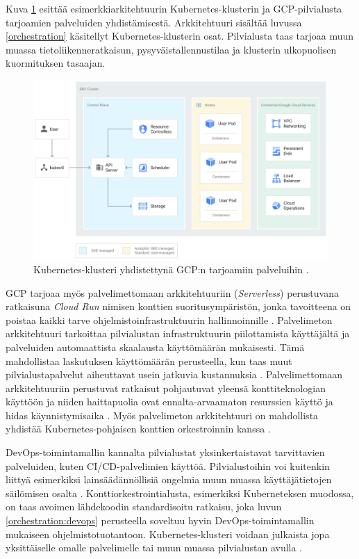 Kuva \ref{fig:architecture} esittää esimerkkiarkitehtuurin Kubernetes-klusterin ja GCP-pilvialusta tarjoamien palveluiden yhdistämisestä.
Arkkitehtuuri sisältää luvussa \ref{orchestration} käsitellyt Kubernetes-klusterin osat.
Pilvialusta taas tarjoaa muun muassa tietoliikenneratkaisun, pysyväistallennustilaa ja klusterin ulkopuolisen kuormituksen tasaajan.


\begin{figure}[ht]
\begin{center}
\includegraphics[width=1\textwidth]{figures/gke_architecture.png}
\caption{Kubernetes-klusteri yhdistettynä GCP:n tarjoamiin palveluihin \cite{cluster23}\label{fig:architecture}.}
\end{center}
\end{figure}

GCP tarjoaa myös palvelimettomaan arkkitehtuuriin (\textit{Serverless}) perustuvana ratkaisuna \textit{Cloud Run} nimisen konttien suoritusympäristön, jonka tavoitteena on poistaa kaikki tarve ohjelmistoinfrastruktuurin hallinnoinnille \cite{Products23}.
Palvelimeton arkkitehtuuri tarkoittaa pilvialustan infrastruktuurin piilottamista käyttäjältä ja palveluiden automaattista skaalausta käyttömäärän mukaisesti.
Tämä mahdollistaa laskutuksen käyttömäärän perusteella, kun taas muut pilvialustapalvelut aiheuttavat usein jatkuvia kustannuksia \cite{shafiei22}.
Palvelimettomaan arkkitehtuuriin perustuvat ratkaisut pohjautuvat yleensä konttiteknologian käyttöön ja niiden haittapuolia ovat ennalta-arvaamaton resurssien käyttö ja hidas käynnistymisaika \cite{shafiei22, mondal22}.
Myös palvelimeton arkkitehtuuri on mahdollista yhdistää Kubernetes-pohjaisen konttien orkestroinnin kanssa \cite{mondal22}. 

DevOps-toimintamallin kannalta pilvialustat yksinkertaistavat tarvittavien palveluiden, kuten CI/CD-palvelimien käyttöä.
Pilvialustoihin voi kuitenkin liittyä esimerkiksi lainsäädännöllisiä ongelmia muun muassa käyttäjätietojen säilömisen osalta \cite{Barati22}.
Konttiorkestrointialusta, esimerkiksi Kuberneteksen muodossa, on taas avoimen lähdekoodin standardisoitu ratkaisu, joka luvun \ref{orchestration:devops} perusteella soveltuu hyvin DevOps-toimintamallin mukaiseen ohjelmistotuotantoon.
Kubernetes-klusteri voidaan julkaista jopa yksittäiselle omalle palvelimelle tai muun muassa pilvialustan avulla \cite{Muddinagiri19, Khan22}.

